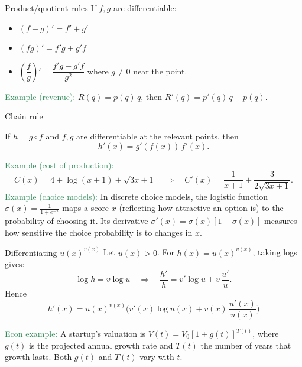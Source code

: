 \documentclass[11pt,aspectratio=169]{beamer}
\begin{document}
\begin{frame}{Product/quotient rules}
If $f,g$ are differentiable:
\begin{itemize}
\item $(f+g)'=f'+g'$\\[4mm]
\item $(fg)'=f'g+g'f$ \quad {}\\[4mm]
\item $\left(\dfrac{f}{g}\right)'=\dfrac{f'g-g'f}{g^2}$ where $g\ne 0$ near the point.\\[7mm]
\end{itemize}
\smallskip
\textcolor{SeaGreen}{Example (revenue):} $R(q)=p(q)\,q$, then $R'(q)=p'(q)\,q+p(q)$.
\end{frame}

\begin{frame}{Chain rule}
\begin{alertblock}{}
If $h=g\circ f$ and $f,g$ are differentiable at the relevant points, then
\[
h'(x)=g'(f(x))\,f'(x).
\]
\end{alertblock}

\textcolor{SeaGreen}{Example (cost of production):}
\[
C(x)=4+\log(x+1)+\sqrt{3x+1}\quad\Rightarrow\quad
C'(x)=\frac{1}{x+1}+\frac{3}{2\sqrt{3x+1}}.
\]
\textcolor{SeaGreen}{Example (choice models):} In discrete choice models, the logistic function 
$\sigma(x)=\tfrac{1}{1+e^{-x}}$ maps a score $x$ (reflecting how attractive an option is) 
to the probability of choosing it. Its derivative $\sigma'(x)=\sigma(x)[1-\sigma(x)]$ 
measures how sensitive the choice probability is to changes in $x$.\end{frame}




\begin{frame}{Differentiating $u(x)^{v(x)}$}
\small
Let $u(x) > 0$. For $h(x) = u(x)^{v(x)}$, taking logs gives:
\[
\log h = v\log u
\quad\Rightarrow\quad
\frac{h'}{h} = v'\log u + v\,\frac{u'}{u}.
\]
Hence
\[
\boxed{\;h'(x) = u(x)^{v(x)}\Big(v'(x)\log u(x) + v(x)\,\frac{u'(x)}{u(x)}\Big)\;}
\]

\medskip
\textcolor{SeaGreen}{Econ example:}  
A startup's valuation is $V(t) = V_0[1+g(t)]^{T(t)}$, where  
$g(t)$ is the projected annual growth rate and $T(t)$ the number of years that growth lasts.  
Both $g(t)$ and $T(t)$ vary with $t$.
\end{frame}
\end{document}
